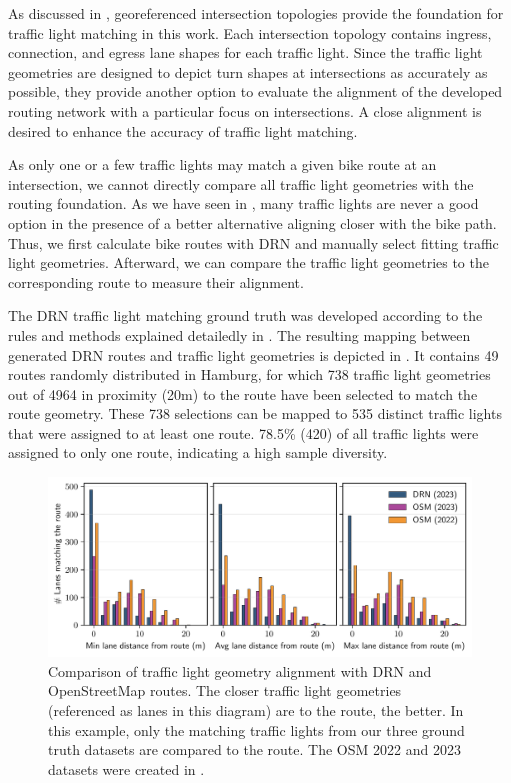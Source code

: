 As discussed in , georeferenced intersection topologies provide the foundation for traffic light matching in this work. Each intersection topology contains ingress, connection, and egress lane shapes for each traffic light. Since the traffic light geometries are designed to depict turn shapes at intersections as accurately as possible, they provide another option to evaluate the alignment of the developed routing network with a particular focus on intersections. A close alignment is desired to enhance the accuracy of traffic light matching.

As only one or a few traffic lights may match a given bike route at an intersection, we cannot directly compare all traffic light geometries with the routing foundation. As we have seen in , many traffic lights are never a good option in the presence of a better alternative aligning closer with the bike path. Thus, we first calculate bike routes with DRN and manually select fitting traffic light geometries. Afterward, we can compare the traffic light geometries to the corresponding route to measure their alignment. 

The DRN traffic light matching ground truth was developed according to the rules and methods explained detailedly in . The resulting mapping between generated DRN routes and traffic light geometries is depicted in . It contains 49 routes randomly distributed in Hamburg, for which 738 traffic light geometries out of 4964 in proximity (20m) to the route have been selected to match the route geometry. These 738 selections can be mapped to 535 distinct traffic lights that were assigned to at least one route. 78.5\% (420) of all traffic lights were assigned to only one route, indicating a high sample diversity.

\begin{figure}[t]
\centering 
\includegraphics[width=\linewidth]{images/routing-lane-alignment.pdf}
\caption{Comparison of traffic light geometry alignment with DRN and OpenStreetMap routes. The closer traffic light geometries (referenced as lanes in this diagram) are to the route, the better. In this example, only the matching traffic lights from our three ground truth datasets are compared to the route. The OSM 2022 and 2023 datasets were created in .}
\label{fig:routing-lane-alignment}
\end{figure}

